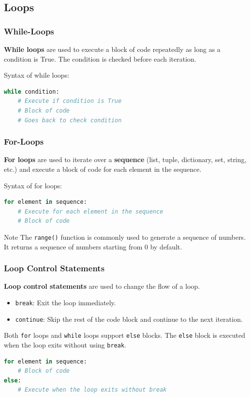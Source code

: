 \documentclass[beamer, en, version=2.0]{huangfusl-template}
\begin{document}
    \subsection{Loops}
    \begin{frame}[fragile]
        \frametitle{While-Loops}

        \textbf{While loops} are used to execute a block of code repeatedly as long as a condition is True. The condition is checked before each iteration.

        Syntax of while loops:

\begin{lstlisting}[language=python]
while condition:
    # Execute if condition is True
    # Block of code
    # Goes back to check condition
\end{lstlisting}
    \end{frame}
    \begin{frame}[fragile]
        \frametitle{For-Loops}

        \textbf{For loops} are used to iterate over a \textbf{sequence} (list, tuple, dictionary, set, string, etc.) and execute a block of code for each element in the sequence.

        Syntax of for loops:
\begin{lstlisting}[language=python]
for element in sequence:
    # Execute for each element in the sequence
    # Block of code
\end{lstlisting}

        \begin{block}{Note}
            The {\footnotesize\verb|range()|} function is commonly used to generate a sequence of numbers. It returns a sequence of numbers starting from 0 by default.
        \end{block}
    \end{frame}
    \begin{frame}[fragile]
        \frametitle{Loop Control Statements}

        \textbf{Loop control statements} are used to change the flow of a loop.

        \begin{itemize}
            \item {\footnotesize\verb|break|}: Exit the loop immediately.
            \item {\footnotesize\verb|continue|}: Skip the rest of the code block and continue to the next iteration.
        \end{itemize}

        Both {\footnotesize\verb|for|} loops and {\footnotesize\verb|while|} loops support {\footnotesize\verb|else|} blocks. The {\footnotesize\verb|else|} block is executed when the loop exits without using {\footnotesize\verb|break|}.

\begin{lstlisting}[language=python]
for element in sequence:
    # Block of code
else:
    # Execute when the loop exits without break
\end{lstlisting}
    \end{frame}
\end{document}
